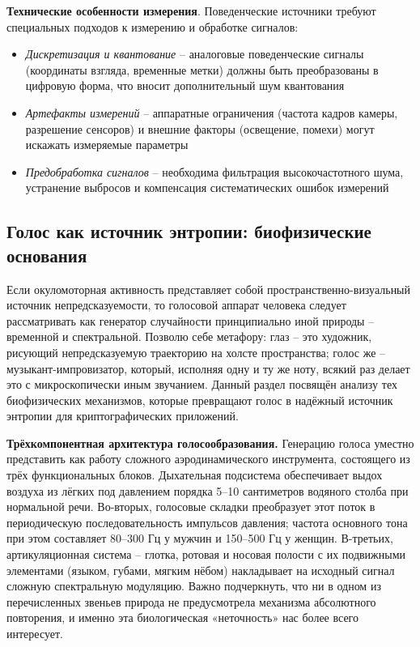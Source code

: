 \documentclass[14pt, a4paper]{extreport}
\begin{document}
\textbf{Технические особенности измерения}. Поведенческие источники требуют специальных подходов к измерению и обработке сигналов:
\begin{itemize}
    \item \textit{Дискретизация и квантование} -- аналоговые поведенческие сигналы (координаты взгляда, временные метки) должны быть преобразованы в цифровую форма, что вносит дополнительный шум квантования
    \item \textit{Артефакты измерений} -- аппаратные ограничения (частота кадров камеры, разрешение сенсоров) и внешние факторы (освещение, помехи) могут искажать измеряемые параметры
    \item \textit{Предобработка сигналов} -- необходима фильтрация высокочастотного шума, устранение выбросов и компенсация систематических ошибок измерений
\end{itemize}
\subsection{Голос как источник энтропии: биофизические основания}

Если окуломоторная активность представляет собой пространственно-визуальный источник непредсказуемости, то голосовой аппарат человека следует рассматривать как генератор случайности принципиально иной природы -- временной и спектральной. Позволю себе метафору: глаз -- это художник, рисующий непредсказуемую траекторию на холсте пространства; голос же -- музыкант-импровизатор, который, исполняя одну и ту же ноту, всякий раз делает это с микроскопически иным звучанием. Данный раздел посвящён анализу тех биофизических механизмов, которые превращают голос в надёжный источник энтропии для криптографических приложений.

\textbf{Трёхкомпонентная архитектура голосообразования.} Генерацию голоса уместно представить как работу сложного аэродинамического инструмента, состоящего из трёх функциональных блоков. Дыхательная подсистема обеспечивает выдох воздуха из лёгких под давлением порядка 5–10 сантиметров водяного столба при нормальной речи. Во-вторых, голосовые складки преобразует этот поток в периодическую последовательность импульсов давления; частота основного тона при этом составляет 80–300 Гц у мужчин и 150–500 Гц у женщин. В-третьих, артикуляционная система -- глотка, ротовая и носовая полости с их подвижными элементами (языком, губами, мягким нёбом) накладывает на исходный сигнал сложную спектральную модуляцию. Важно подчеркнуть, что ни в одном из перечисленных звеньев природа не предусмотрела механизма абсолютного повторения, и именно эта биологическая «неточность» нас более всего интересует.
\end{document}
